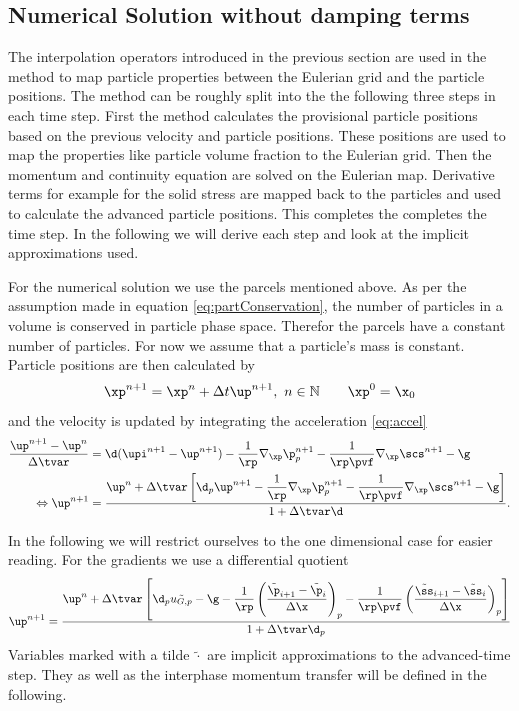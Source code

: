 \color{black}

\subsection{Numerical Solution without damping terms}
The interpolation operators introduced in the previous section are used in the \MP method to map particle properties between the Eulerian grid and the particle positions.
The method can be roughly split into the the following three steps in each time step.
First the method calculates the provisional particle positions based on the previous velocity and particle positions.
These positions are used to map the properties like particle volume fraction to the Eulerian grid.
Then the momentum and continuity equation are solved on the Eulerian map.
Derivative terms for example for the solid stress are mapped back to the particles and used to calculate the advanced particle positions.
This completes the completes the time step.
In the following we will derive each step and look at the implicit approximations used.

For the numerical solution we use the parcels mentioned above. As per the assumption made in equation \eqref{eq:partConservation}, the number of particles in a volume is conserved in particle phase space. 
Therefor the parcels have a constant number of particles.
For now we assume that a particle's mass is constant.
Particle positions are then calculated by
\begin{equation}
    \label{eq:MPposition}
    \xp^{n+1} = \xp^{n} + \Delta t \up^{n+1}, \ n \in \mathbb{N} \qquad \xp^{0} = \x_0
\end{equation}
and the velocity is updated by integrating the acceleration \eqref{eq:accel}
\begin{align}
    \label{eq:errVel}
    \dfrac{\up^{n+1} - \up^{n}}{\Delta \tvar} &= \d (\upi^{n+1} -
    \up^{n+1})  - \dfrac{1}{\rp} \nabla_{\xp} \p_p^{n+1} - \dfrac{1}{\rp \pvf} \nabla_{\xp} \scs^{n+1} - \g \\
    \Leftrightarrow \up^{n+1} &= \dfrac{\up^n + \Delta \tvar \left[ \d_p \up^{n+1} - \dfrac{1}{\rp} \nabla_{\xp} \p_p^{n+1} - \dfrac{1}{\rp \pvf} \nabla_{\xp} \scs^{n+1} - \g \right]}{1 + \Delta \tvar \d} .
\end{align}

In the following we will restrict ourselves to the one dimensional case for easier reading. 
For the gradients we use a differential quotient 
\begin{equation}
\label{eq:MPvelocity}
    \up^{n+1} = \dfrac{\up^n + \Delta \tvar \left[\d_p \tilde{u_{G,p}} - \g - \dfrac{1}{\rp} \left(\dfrac{\tilde{\p}_{i+1} - \tilde{\p}_i}{\Delta \x} \right)_p - \dfrac{1}{\rp \pvf} \left( \dfrac{\tilde{\ss}_{i+1} - \tilde{\ss}_i}{\Delta \x}\right)_p \right]}{1 + \Delta \tvar \d_p}
\end{equation}
Variables marked with a tilde $\tilde{\cdot}$ are implicit approximations to the advanced-time step. They as well as the interphase momentum transfer will be defined in the following.

